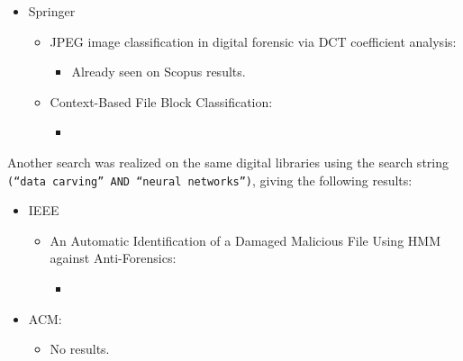 \begin{itemize}
    \item Springer
    \begin{itemize}
        \item \cite{Alherbawi201812805} JPEG image classification in digital forensic via DCT coefficient analysis:
        \begin{itemize}
            \item Already seen on Scopus results.
        \end{itemize}
        \item \cite{sportiello2012context} Context-Based File Block Classification:
        \begin{itemize}
            \item
        \end{itemize}
    \end{itemize}
\end{itemize}

Another search was realized on the same digital libraries using the search string \texttt{(``data carving'' AND ``neural networks'')}, giving the following results:

\begin{itemize}
    \item IEEE
    \begin{itemize}
        \item \cite{4624000} An Automatic Identification of a Damaged Malicious File Using HMM against Anti-Forensics:
        \begin{itemize}
            \item
        \end{itemize}
    \end{itemize}
\end{itemize}

\begin{itemize}
    \item ACM:
        \begin{itemize}
            \item No results.
        \end{itemize}
\end{itemize}

